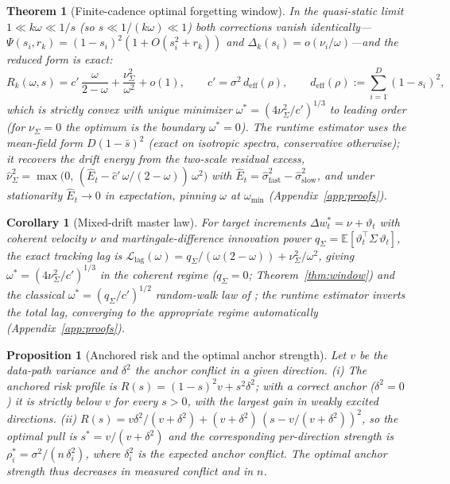 \documentclass[10pt]{article}
\newtheorem{theorem}{Theorem}
\newtheorem{proposition}{Proposition}
\newtheorem{corollary}{Corollary}
\newcommand{\E}{\mathbb{E}}
\begin{document}
\begin{theorem}[Finite-cadence optimal forgetting window]
In the quasi-static limit $1 \ll k\omega \ll 1/s$ (so $s \ll 1/(k\omega) \ll 1$) both corrections vanish identically---$\Psi(s_i,r_k) = (1-s_i)^2(1+O(s_i^2+r_k))$ and $\Delta_k(s_i) = o(\nu_i/\omega)$---and the reduced form is exact:
\[
  R_k(\omega,s) = c'\,\frac{\omega}{2-\omega} + \frac{\nu^2_\Sigma}{\omega^2} + o(1),
  \qquad c' = \sigma^2\,d_{\mathrm{eff}}(\rho),
  \qquad d_{\mathrm{eff}}(\rho) := \sum_{i=1}^D (1-s_i)^2,
\]
which is strictly convex with unique minimizer $\omega^* = (4\nu^2_\Sigma/c')^{1/3}$ to leading order (for $\nu_\Sigma=0$ the optimum is the boundary $\omega^*=0$).
The runtime estimator uses the mean-field form $D(1-\bar s)^2$ (exact on isotropic spectra, conservative otherwise); it recovers the drift energy from the two-scale residual excess, $\widehat\nu^2_\Sigma = \max\bigl(0,\,(\widehat E_t - \hat c'\,\omega/(2-\omega))\,\omega^2\bigr)$ with $\widehat E_t = \widehat\sigma^2_{\mathrm{fast}} - \widehat\sigma^2_{\mathrm{slow}}$, and under stationarity $\widehat E_t \to 0$ in expectation, pinning $\omega$ at $\omega_{\min}$ (Appendix~\ref{app:proofs}).
\end{theorem}

\begin{corollary}[Mixed-drift master law]
\label{cor:mixed}
For target increments $\Delta w^*_t = \nu + \vartheta_t$ with coherent velocity $\nu$ and martingale-difference innovation power $q_\Sigma = \E[\vartheta_t^\top \Sigma\, \vartheta_t]$, the exact tracking lag is $\mathcal{L}_{\mathrm{lag}}(\omega) = q_\Sigma/(\omega(2{-}\omega)) + \nu^2_\Sigma/\omega^2$, giving $\omega^* = (4\nu^2_\Sigma/c')^{1/3}$ in the coherent regime ($q_\Sigma = 0$; Theorem~\ref{thm:window}) and the classical $\omega^* = (q_\Sigma/c')^{1/2}$ random-walk law of \citet{widrow1976}; the runtime estimator inverts the total lag, converging to the appropriate regime automatically (Appendix~\ref{app:proofs}).
\end{corollary}

\begin{proposition}[Anchored risk and the optimal anchor strength]
\label{prop:conflict}
Let $v$ be the data-path variance and $\delta^2$ the anchor conflict in a given direction.
(i) The anchored risk profile is $R(s) = (1-s)^2 v + s^2 \delta^2$; with a correct anchor ($\delta^2 = 0$) it is strictly below $v$ for every $s > 0$, with the largest gain in weakly excited directions.
(ii) $R(s) = v\delta^2/(v+\delta^2) + (v+\delta^2)\,(s - v/(v+\delta^2))^2$, so the optimal pull is $s^* = v/(v+\delta^2)$ and the corresponding per-direction strength is $\rho^*_i = \sigma^2/(n\,\delta^2_i)$, where $\delta^2_i$ is the expected anchor conflict.
The optimal anchor strength thus decreases in measured conflict and in $n$.
\end{proposition}
\end{document}
